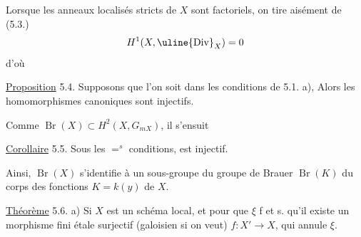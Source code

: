 
Lorsque   les anneaux localisés stricts de $X$ sont factoriels, on tire aisément de (5.3.)
\[
H^1(X,\uline{\mathrm{Div}}_X)=0
\]
d'où 

\uline{Proposition} 5.4. Supposons que l'on soit dans les conditions de 5.1. a),  Alors les homomorphismes canoniques
sont injectifs.

Comme $\operatorname{Br}(X)\subset H^2(X,G_{mX})$, il s'ensuit

\uline{Corollaire} 5.5. Sous les $=^{s}$ conditions,
est injectif.

Ainsi, $\operatorname{Br}(X)$ s'identifie  à un sous-groupe du groupe de Brauer $\operatorname{Br}(K)$ du corps des fonctions $K=k(y)$ de $X$.

\uline{Théorème} 5.6. 
a) Si $X$ est un schéma local, et  pour que $\xi$   f et s. qu'il existe un morphisme fini étale surjectif (galoisien si on veut) $f:X'\longrightarrow X$,  qui  annule $\xi$.

